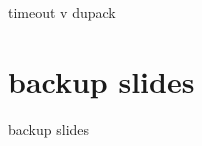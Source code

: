 \date{}
\title{}
\date{}
\usepackage{pgfplots}
\pgfplotsset{compat=1.16}

\begin{frame}
    \titlepage
\end{frame}

\begin{frame}{timeout v dupack}
\end{frame}



\section{backup slides}
\begin{frame}{backup slides}
\end{frame}

%


